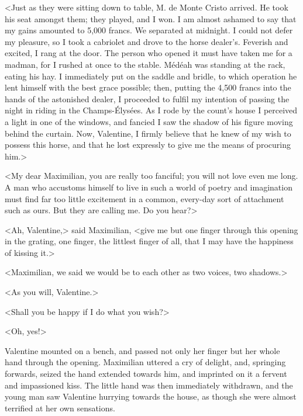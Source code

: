  <Just as they were sitting down to table, M. de Monte Cristo arrived. He took his seat amongst them; they played, and I won. I am almost ashamed to say that my gains amounted to 5,000 francs. We separated at midnight. I could not defer my pleasure, so I took a cabriolet and drove to the horse dealer's. Feverish and excited, I rang at the door. The person who opened it must have taken me for a madman, for I rushed at once to the stable. Médéah was standing at the rack, eating his hay. I immediately put on the saddle and bridle, to which operation he lent himself with the best grace possible; then, putting the 4,500 francs into the hands of the astonished dealer, I proceeded to fulfil my intention of passing the night in riding in the Champs-Élysées. As I rode by the count's house I perceived a light in one of the windows, and fancied I saw the shadow of his figure moving behind the curtain. Now, Valentine, I firmly believe that he knew of my wish to possess this horse, and that he lost expressly to give me the means of procuring him.> 

 <My dear Maximilian, you are really too fanciful; you will not love even me long. A man who accustoms himself to live in such a world of poetry and imagination must find far too little excitement in a common, every-day sort of attachment such as ours. But they are calling me. Do you hear?> 

 <Ah, Valentine,> said Maximilian, <give me but one finger through this opening in the grating, one finger, the littlest finger of all, that I may have the happiness of kissing it.> 

 <Maximilian, we said we would be to each other as two voices, two shadows.> 

 <As you will, Valentine.> 

 <Shall you be happy if I do what you wish?> 

 <Oh, yes!> 

 Valentine mounted on a bench, and passed not only her finger but her whole hand through the opening. Maximilian uttered a cry of delight, and, springing forwards, seized the hand extended towards him, and imprinted on it a fervent and impassioned kiss. The little hand was then immediately withdrawn, and the young man saw Valentine hurrying towards the house, as though she were almost terrified at her own sensations. 
